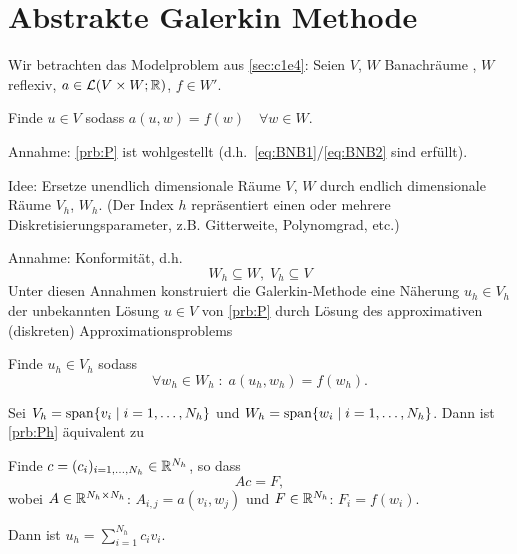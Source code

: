\documentclass[../skript.tex]{subfiles}
\begin{document}
\section{Abstrakte Galerkin Methode}
\label{sec:c1e6}
Wir betrachten das Modelproblem aus \cref{sec:c1e4}:
Seien $V$, $W$ Banachräume , $W$ reflexiv, $a\in\mathcal{L}(V\times W;\mathbb{R})$, $ f \in W'$.
\addtocounter{problem}{-2}
\begin{problem} %
Finde $u \in V$ sodass $a(u, w) = f(w) \quad \forall w \in W$.
\end{problem}
\addtocounter{problem}{1}
Annahme: \cref{prb:P} ist wohlgestellt (d.h.\ \cref{eq:BNB1}\slash{}\cref{eq:BNB2} sind erfüllt).

Idee: Ersetze unendlich dimensionale Räume $V$, $W$ durch endlich dimensionale Räume $V_h$, $W_h$. (Der Index $h$ repräsentiert einen oder mehrere Diskretisierungsparameter, z.B. Gitterweite, Polynomgrad, etc.)

Annahme: Konformität, d.h.
\[
	W_h \subseteq W, \; V_h \subseteq V 
\]
Unter diesen Annahmen konstruiert die Galerkin-Methode eine Näherung
$u_h\in V_h$ der unbekannten Lösung $u\in V$ von \cref{prb:P} durch Lösung
des approximativen (diskreten) Approximationsproblems
\begin{problem} %
\label{prb:Ph}
Finde $u_h \in V_h$ sodass
\[
	\forall w_h \in W_h \; : \; a(u_h, w_h) = f(w_h).
\]
\end{problem}

Sei $V_h = \operatorname*{span} \{v_i \mid i = 1,\ldots,N_h\}$ und $W_h = \operatorname*{span}\{w_i \mid i=1,\ldots,N_h\}$.
Dann ist \cref{prb:Ph} äquivalent zu
\begin{problem}
Finde $c=(c_i)_{i=1,\ldots,N_h}\in\mathbb{R}^{N_h}$, so dass 
\[Ac=F,\]
wobei $A\in\mathbb{R}^{N_h\times N_h}$: $A_{i,j}=a(v_i,w_j)$ und 
$F\in\mathbb{R}^{N_h}$: $F_i=f(w_i)$.
\end{problem}
Dann ist $u_h = \sum_{i=1}^{N_h}c_i v_i$.
\end{document}
